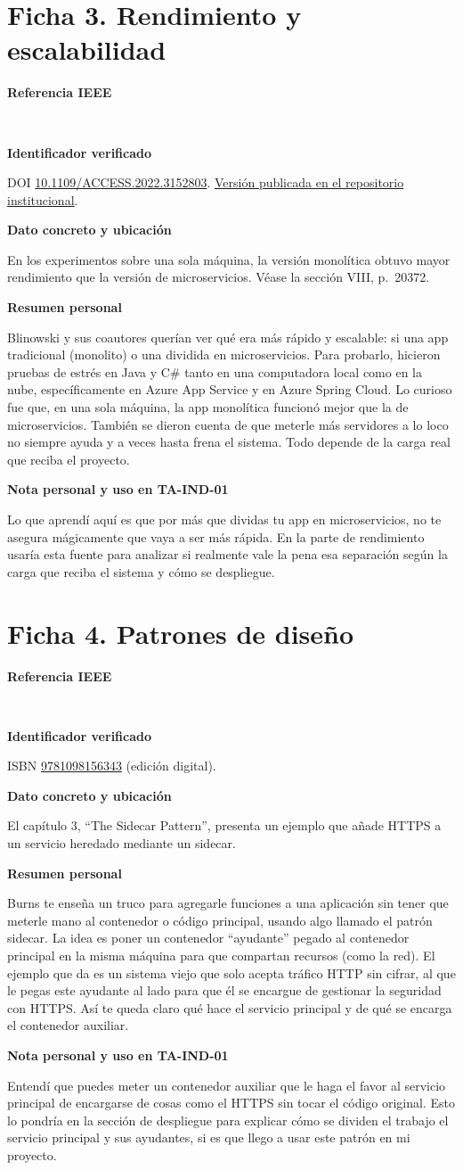 \documentclass[11pt,a4paper]{article}
\newcommand{\ficha}[6]{%
  \section*{\color{tinta}#1}
  \textbf{Referencia IEEE}\par
  \cite{#2}\ \fullcite{#2}\par
  \textbf{Identificador verificado}\par
  #3\par
  \textbf{Dato concreto y ubicación}\par
  #4\par
  \textbf{Resumen personal}\par\nopagebreak[4]
  #5\par
  \textbf{Nota personal y uso en TA-IND-01}\par\nopagebreak[4]
  #6\par
}
\begin{document}
\ficha{Ficha 3. Rendimiento y escalabilidad}{blinowski2022}
  {DOI \href{https://doi.org/10.1109/ACCESS.2022.3152803}{10.1109/ACCESS.2022.3152803}. \href{https://mostwiedzy.pl/pl/publication/download/1/monolithic-vs-microservice-architecture-a-performance-and-scalability-evaluation_70008.pdf}{Versión publicada en el repositorio institucional}.}
  {En los experimentos sobre una sola máquina, la versión monolítica obtuvo mayor rendimiento que la versión de microservicios. Véase la sección VIII, p.~20372.}
  {Blinowski y sus coautores querían ver qué era más rápido y escalable: si una app tradicional (monolito) o una dividida en microservicios. Para probarlo, hicieron pruebas de estrés en Java y C\# tanto en una computadora local como en la nube, específicamente en Azure App Service y en Azure Spring Cloud. Lo curioso fue que, en una sola máquina, la app monolítica funcionó mejor que la de microservicios. También se dieron cuenta de que meterle más servidores a lo loco no siempre ayuda y a veces hasta frena el sistema. Todo depende de la carga real que reciba el proyecto.}
  {Lo que aprendí aquí es que por más que dividas tu app en microservicios, no te asegura mágicamente que vaya a ser más rápida. En la parte de rendimiento usaría esta fuente para analizar si realmente vale la pena esa separación según la carga que reciba el sistema y cómo se despliegue.}

\ficha{Ficha 4. Patrones de diseño}{burns2024}
  {ISBN \href{https://www.oreilly.com/library/view/designing-distributed-systems/9781098156343/}{9781098156343} (edición digital).}
  {El capítulo 3, ``The Sidecar Pattern'', presenta un ejemplo que añade HTTPS a un servicio heredado mediante un sidecar.}
  {Burns te enseña un truco para agregarle funciones a una aplicación sin tener que meterle mano al contenedor o código principal, usando algo llamado el patrón sidecar. La idea es poner un contenedor ``ayudante'' pegado al contenedor principal en la misma máquina para que compartan recursos (como la red). El ejemplo que da es un sistema viejo que solo acepta tráfico HTTP sin cifrar, al que le pegas este ayudante al lado para que él se encargue de gestionar la seguridad con HTTPS. Así te queda claro qué hace el servicio principal y de qué se encarga el contenedor auxiliar.}
  {Entendí que puedes meter un contenedor auxiliar que le haga el favor al servicio principal de encargarse de cosas como el HTTPS sin tocar el código original. Esto lo pondría en la sección de despliegue para explicar cómo se dividen el trabajo el servicio principal y sus ayudantes, si es que llego a usar este patrón en mi proyecto.}
\end{document}

